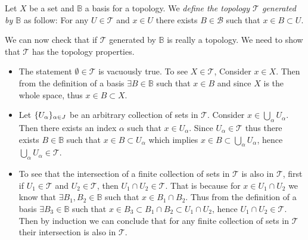 \begin{definition}
	\label{def:topology_generated_by_a_basis}
	Let $ X $ be a set and $ \mathbb{B} $ a basis for a topology. We \emph{define the topology $ \mathcal{T} $ generated by $ \mathbb{B} $} as follow: For any $ U \in \mathcal{T} $ and $ x \in U $ there exists $ B \in \mathcal{B} $ such that $ x \in B \subset U $.
\end{definition}
\begin{remark}
	\label{remark:TopologyGeneratedByABasis}
	We can now check that if $ \mathcal{T} $ generated by $ \mathbb{B} $ is really a topology. We need to show that $ \mathcal{T} $ has the topology properties.
	\begin{itemize}
		\item The statement $ \emptyset \in \mathcal{T} $ is vacuously true. To see $ X \in \mathcal{T} $, Consider $ x \in X $. Then from the definition of a basis $ \exists B \in \mathbb{B} $ such that $ x \in B $ and since $ X $ is the whole space, thus $ x \in B \subset X $.
		\item Let $ \{U_\alpha\}_{\alpha \in J} $ be an arbitrary collection of sets in $ \mathcal{T} $. Consider $ x \in \bigcup_\alpha U_\alpha $. Then there exists an index $ \alpha $ such that $ x \in U_\alpha $. Since $ U_\alpha \in \mathcal{T} $ thus there exists $ B \in \mathbb{B} $ such that $ x \in B \subset U_\alpha $ which implies $ x \in B \subset \bigcup_\alpha U_\alpha $, hence $ \bigcup_\alpha U_\alpha \in \mathcal{T} $.
		\item To see that the intersection of a finite collection of sets in $ \mathcal{T} $ is also in $ \mathcal{T} $, first if $ U_1 \in \mathcal{T} $ and $ U_2 \in \mathcal{T} $, then $ U_1 \cap U_2 \in \mathcal{T} $. That is because for $ x\in U_1 \cap U_2 $ we know that $ \exists B_1,B_2 \in \mathbb{B} $ such that $ x\in B_1\cap B_2 $. Thus from the definition of a basis $ \exists B_3 \in \mathbb{B} $ such that $ x \in B_3 \subset B_1\cap B_2 \subset U_1\cap U_2 $, hence $ U_1\cap U_2 \in \mathcal{T} $. Then by induction we can conclude that for any finite collection of sets in $ \mathcal{T} $ their intersection is also in $ \mathcal{T} $.
 	\end{itemize}
\end{remark}

